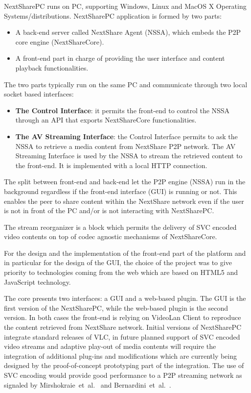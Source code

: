 NextSharePC runs on PC, supporting Windows, Linux and MacOS X Operating
Systems/distributions. NextSharePC application is formed by two parts:
\begin{itemize}
  \item A back-end server called NextShare Agent (NSSA), which embeds the P2P
  core engine (NextShareCore).
  \item A front-end part in charge of providing the user interface and content
  playback functionalities.
\end{itemize}

The two parts typically run on the same PC and communicate through two local
socket based interfaces:
\begin{itemize}
  \item \textbf{The Control Interface}: it permits the front-end to control
  the NSSA through an API that exports NextShareCore functionalities.
  \item \textbf{The AV Streaming Interface}: the Control Interface permits to
  ask the NSSA to retrieve a media content from NextShare P2P network. The AV
  Streaming Interface is used by the NSSA to stream the retrieved content to
  the front-end. It is implemented with a local HTTP connection.
\end{itemize}

The split between front-end and back-end let the P2P engine (NSSA) run in the
background regardless if the front-end interface (GUI) is running or not. This
enables the peer to share content within the NextShare network even if the
user is not in front of the PC and/or is not interacting with NextSharePC.

The stream reorganizer is a block which permits the delivery of SVC encoded
video contents on top of codec agnostic mechanisms of NextShareCore.

For the design and the implementation of the front-end part of the platform
and in particular for the design of the GUI, the choice of the project was to
give priority to technologies coming from the web which are based on HTML5 and
JavaScript technology.

The core presents two interfaces: a GUI and a web-based plugin. The GUI is the
first version of the NextSharePC, while the web-based plugin is the second
version. In both cases the front-end is relying on VideoLan Client to
reproduce the content retrieved from NextShare network. Initial versions of
NextSharePC integrate standard releases of VLC, in future planned support of
SVC encoded video streams and adaptive play-out of media contents will require
the integration of additional plug-ins and modifications which are currently
being designed by the proof-of-concept prototyping part of the integration.
The use of SVC encoding would provide good performance to a P2P streaming
network as signaled by Mirshokraie~et~al.~\cite{p2p-streaming-svc} and
Bernardini~et~al.~\cite{p2p-streaming-net-coding}.

